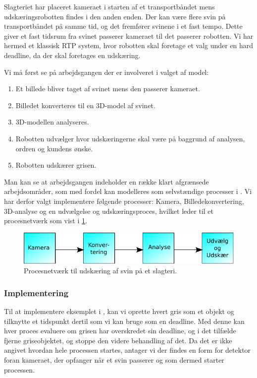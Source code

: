 Slagteriet har placeret kameraet i starten af et transportbåndet mens udskæringsrobotten findes i den anden enden. Der kan være flere svin på transportbåndet på samme tid, og det fremfører svinene i et fast tempo. Dette giver et fast tidsrum fra svinet passerer kameraet til det passerer robotten. Vi har hermed et klassisk RTP system, hvor robotten skal foretage et valg under en hard deadline, da der skal foretages en udskæring.

Vi må først se på arbejdsgangen der er involveret i valget af model:
\begin{enumerate}
\tightlist
	\item Et billede bliver taget af svinet mens den passerer kameraet.
	\item Billedet konverteres til en 3D-model af svinet.
	\item 3D-modellen analyseres.
	\item Robotten udvælger hvor udskæringerne skal være på baggrund af analysen, ordren og kundens ønske.
	\item Robotten udskærer grisen.
\end{enumerate}

Man kan se at arbejdsgangen indeholder en  række klart afgrænsede arbejdsområder, som med fordel kan modelleres som selvstændige processer i \pycsp.  Vi har derfor valgt implementere følgende processer: Kamera, Billedekonvertering, 3D-analyse og en udvælgelse og udskæringsproces, hvilket leder til et procesnetværk som vist i \cref{fig:pig-network}.

\begin{figure}
 \begin{center}
  \includegraphics[scale=1]{images/pig-network}
	\caption{Procesnetværk til udskæring af svin på et slagteri.}
	\label{fig:pig-network}
\end{center}
\end{figure}

\subsubsection*{Implementering}
Til at implementere eksemplet i \pycsp, kan vi oprette hvert gris som et objekt og tilknytte et tidspunkt dertil som vi kan bruge som en deadline. Med denne kan hver proces evaluere om grisen har overskredet sin deadline, og i det tilfælde fjerne griseobjektet, og stoppe den videre behandling af det. Da det er ikke angivet hvordan hele processen startes,  antager vi der findes en form for detektor foran kameraet, der opfanger når et svin passerer og som dermed starter processen. 

